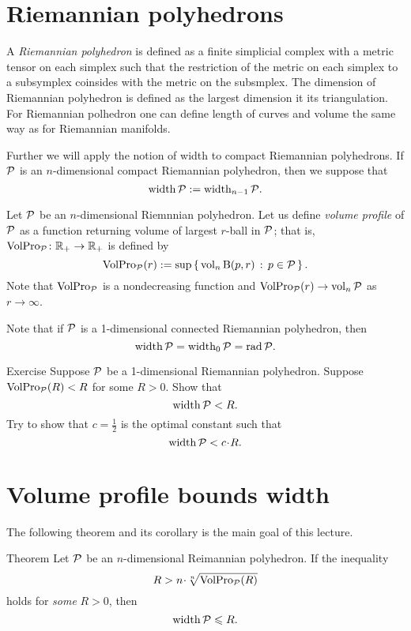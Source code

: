\section{Riemannian polyhedrons}

A \emph{Riemannian polyhedron} is defined as a finite simplicial complex with a metric tensor on each simplex such that the restriction of the metric on each simplex to a subsymplex coinsides with the metric on the subsmplex.
The dimension of Riemannian polyhedron is defined as the largest dimension it its triangulation.
For Riemannian polhedron one can define length of curves and volume the same way as for Riemannian manifolds.


Further we will apply the notion of width to compact Riemannian polyhedrons.
If $\mathcal{P}$ is an $n$-dimensional compact Riemannian polyhedron, then 
we suppose that
\[\operatorname{\rm width}\nolimits\mathcal{P}\mathrel{:=}\operatorname{\rm width}\nolimits_{n-1}\mathcal{P}.\]

Let $\mathcal{P}$ be an $n$-dimensional Riemnnian polyhedron.
Let us define \emph{volume profile} of $\mathcal{P}$ as a function 
returning volume of largest $r$-ball in $\mathcal{P}$;
that is, $\operatorname{\rm VolPro}\nolimits_{\mathcal{P}}\colon\mathbb{R}_+\to\mathbb{R}_+$ is defined by 
\[\operatorname{\rm VolPro}\nolimits_{\mathcal{P}}(r)\mathrel{:=} \sup\left\{\,{\operatorname{\rm vol}\nolimits_n \mathrm{B}{}(p,r)}\,:\,{p\in\mathcal{P}}\,\right\}.\]
Note that $\operatorname{\rm VolPro}\nolimits_{\mathcal{P}}$ is a nondecreasing function and $\VolPro_{\spc{P}}(r)\z\to\vol_n\spc{P}$ as $r\to\infty$.

Note that if $\mathcal{P}$ is a 1-dimensional connected Riemannian polyhedron, then 
\[\operatorname{\rm width}\nolimits\mathcal{P}=\operatorname{\rm width}\nolimits_0\mathcal{P}=\mathop{\rm rad}\nolimits\mathcal{P}.\]

\begin{thm}{Exercise}\label{ex:1D-case}
Suppose $\mathcal{P}$ be a 1-dimensional Riemannian polyhedron.
Suppose $\operatorname{\rm VolPro}\nolimits_{\mathcal{P}}(R)<R$ for some $R>0$.
Show that 
\[\operatorname{\rm width}\nolimits \mathcal{P}<R.\]
Try to show that $c=\tfrac 12$ is the optimal constant such that 
\[\width \spc{P}<c\cdot R.\]
\end{thm}

\section{Volume profile bounds width}

The following theorem and its corollary is the main goal of this lecture.

\begin{thm}{Theorem}\label{thm:width<volpro}
Let $\mathcal{P}$ be an $n$-dimensional Reimannian polyhedron. 
If the inequality 
\[R> n\cdot \sqrt[n]{\VolPro_{\spc{P}}(R)}\]
holds for {}\emph{some} $R>0$, then 
\[\operatorname{\rm width}\nolimits\mathcal{P}\leqslant  R.\]
\end{thm}

